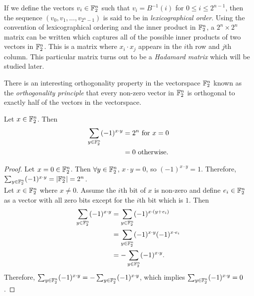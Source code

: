 \par If we define the vectors $v_i\in\mathbb{F}_2^n$ such that $v_i=B^{-1}(i)$
for $0\leq i\leq2^{n-1}$, then the sequence $(v_0,v_1,\allowbreak \dots,
\allowbreak v_{2^n-1})$ is said to be in {\em lexicographical order}.
Using the convention of lexicographical ordering and the inner product in
$\mathbb{F}_2^n$, a $2^n\times 2^n$ matrix can be written which captures all of
the possible inner products of two vectors in $\mathbb{F}_2^n$. This is a matrix
where $x_i\cdot x_j$ appears in the $i$th row and $j$th column. This
particular matrix turns out to be a {\em Hadamard matrix} which will be
studied later.

\par There is an interesting orthogonality property in the vectorspace
$\mathbb{F}_2^n$ known as the {\em orthogonality principle} that every non-zero
vector in $\mathbb{F}_2^n$ is orthogonal to exactly half of the vectors in the
vectorspace.

\begin{theorem}
\label{thm:orthogonality-principle}
  Let $x\in\mathbb{F}_2^n$. Then
  \begin{align*}
    \sum_{y\in\mathbb{F}_2^n}(-1)^{x\cdot y}
      &= 2^n {\rm \ for\ } x=0 \\
      &= 0 {\rm \ otherwise.}
  \end{align*}
\end{theorem}

\begin{proof}
  Let $x=0\in\mathbb{F}_2^n$. Then $\forall y\in\mathbb{F}_2^n$, $x\cdot y=0$, so
  $(-1)^{x\cdot y}=1$. Therefore, $\sum_{y\in\mathbb{F}_2^n}(-1)^{x\cdot y}=
  \allowbreak\lvert\mathbb{F}_2^n\rvert=\allowbreak 2^n$. \\

  Let $x\in\mathbb{F}_2^n$ where $x\not=0$. Assume the $i$th bit of $x$ is
  non-zero and define $e_i\in\mathbb{F}_2^n$ as a vector with all zero bits
  except for the $i$th bit which is $1$. Then
	\begin{align*}
    \sum_{y\in\mathbb{F}_2^n}(-1)^{x\cdot y}
      &= \sum_{y\in\mathbb{F}_2^n}(-1)^{x\cdot (y+e_i)} \\
      &= \sum_{y\in\mathbb{F}_2^n}(-1)^{x\cdot y}(-1)^{x\cdot e_i} \\
      &= -\sum_{y\in\mathbb{F}_2^n}(-1)^{x\cdot y}.
  \end{align*}
  Therefore, $\sum_{y\in\mathbb{F}_2^n}(-1)^{x\cdot y}=\allowbreak
  -\sum_{y\in\mathbb{F}_2^n}(-1)^{x\cdot y}$, which implies
  $\sum_{y\in\mathbb{F}_2^n}(-1)^{x\cdot y}=0$.
\end{proof}

